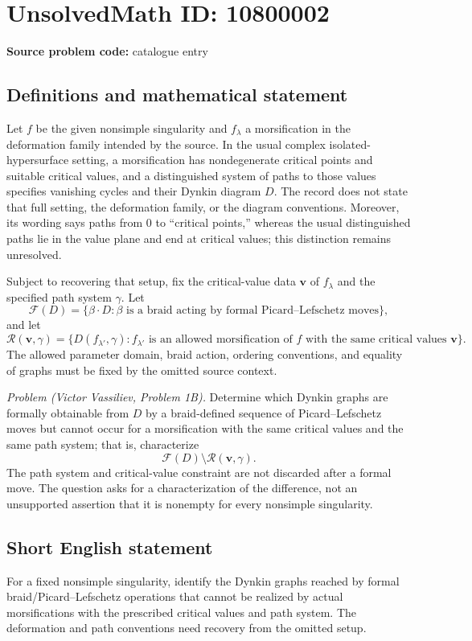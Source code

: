 \documentclass[11pt]{article}
\begin{document}
\section*{UnsolvedMath ID: 10800002}
\textbf{Source problem code:} catalogue entry
\subsection{Definitions and mathematical statement}
Let \(f\) be the given nonsimple singularity and \(f_\lambda\) a morsification in the deformation family intended by the source. In the usual complex isolated-hypersurface setting, a morsification has nondegenerate critical points and suitable critical values, and a distinguished system of paths to those values specifies vanishing cycles and their Dynkin diagram \(D\). The record does not state that full setting, the deformation family, or the diagram conventions. Moreover, its wording says paths from \(0\) to ``critical points,'' whereas the usual distinguished paths lie in the value plane and end at critical values; this distinction remains unresolved.

Subject to recovering that setup, fix the critical-value data \(\mathbf v\) of \(f_\lambda\) and the specified path system \(\gamma\). Let
\[
 \mathcal F(D)=\{\beta\cdot D:\beta\text{ is a braid acting by formal Picard--Lefschetz moves}\},
\]
and let
\[
 \mathcal R(\mathbf v,\gamma)
 =\{D(f_{\lambda'},\gamma): f_{\lambda'}\text{ is an allowed morsification of }f
 \text{ with the same critical values }\mathbf v\}.
\]
The allowed parameter domain, braid action, ordering conventions, and equality of graphs must be fixed by the omitted source context.

\emph{Problem (Victor Vassiliev, Problem 1B).} Determine which Dynkin graphs are formally obtainable from \(D\) by a braid-defined sequence of Picard--Lefschetz moves but cannot occur for a morsification with the same critical values and the same path system; that is, characterize
\[
 \mathcal F(D)\setminus\mathcal R(\mathbf v,\gamma).
\]
The path system and critical-value constraint are not discarded after a formal move. The question asks for a characterization of the difference, not an unsupported assertion that it is nonempty for every nonsimple singularity.
\subsection{Short English statement}
For a fixed nonsimple singularity, identify the Dynkin graphs reached by formal braid/Picard--Lefschetz operations that cannot be realized by actual morsifications with the prescribed critical values and path system. The deformation and path conventions need recovery from the omitted setup.
\end{document}
